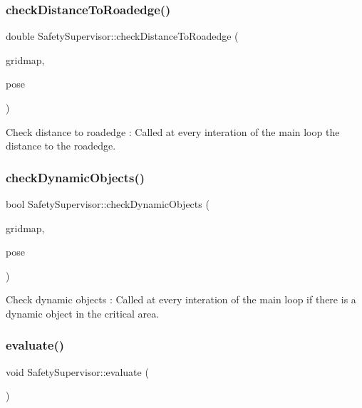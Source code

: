 \subsubsection{\texorpdfstring{check\+Distance\+To\+Roadedge()}{checkDistanceToRoadedge()}}
{\footnotesize\ttfamily double Safety\+Supervisor\+::check\+Distance\+To\+Roadedge (\begin{DoxyParamCaption}\item[{const grid\+\_\+map\+::\+Grid\+Map \&}]{gridmap,  }\item[{const geometry\+\_\+msgs\+::\+Pose \&}]{pose }\end{DoxyParamCaption})\hspace{0.3cm}{\ttfamily [inline]}}



Check distance to roadedge \+: Called at every interation of the main loop  the distance to the roadedge. 

\mbox{\label{classSafetySupervisor_a6455218d3a92c4afab26ea8752f085d3}} 
\subsubsection{\texorpdfstring{check\+Dynamic\+Objects()}{checkDynamicObjects()}}
{\footnotesize\ttfamily bool Safety\+Supervisor\+::check\+Dynamic\+Objects (\begin{DoxyParamCaption}\item[{const grid\+\_\+map\+::\+Grid\+Map \&}]{gridmap,  }\item[{const geometry\+\_\+msgs\+::\+Pose \&}]{pose }\end{DoxyParamCaption})\hspace{0.3cm}{\ttfamily [inline]}}



Check dynamic objects \+: Called at every interation of the main loop  if there is a dynamic object in the critical area. 

\mbox{\label{classSafetySupervisor_ab44ba3b0008dc564ed49aaeb2258f225}} 
\subsubsection{\texorpdfstring{evaluate()}{evaluate()}}
{\footnotesize\ttfamily void Safety\+Supervisor\+::evaluate (\begin{DoxyParamCaption}{ }\end{DoxyParamCaption})\hspace{0.3cm}{\ttfamily [inline]}}



